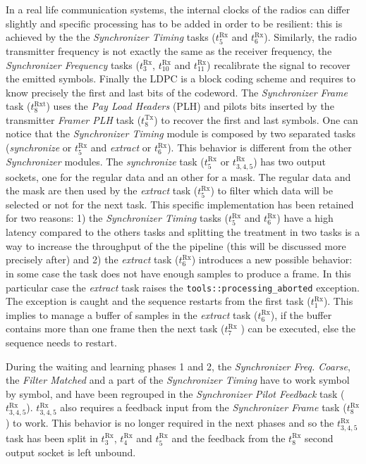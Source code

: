 In a real life communication systems, the internal clocks of the radios can
differ slightly and specific processing has to be added in order to be
resilient: this is achieved by the the \emph{Synchronizer Timing} tasks
($t^\text{Rx}_5$ and $t^\text{Rx}_6$). Similarly, the radio transmitter
frequency is not exactly the same as the receiver frequency, the
\emph{Synchronizer Frequency} tasks ($t^\text{Rx}_3$, $t^\text{Rx}_{10}$ and
$t^\text{Rx}_{11}$) recalibrate the signal to recover the emitted symbols.
Finally the LDPC is a block coding scheme and requires to know precisely the
first and last bits of the codeword. The \emph{Synchronizer Frame} task
($t^\text{Rxt}_8$) uses the \emph{Pay Load Headers} (PLH) and pilots bits
inserted by the transmitter \emph{Framer PLH} task ($t^\text{Tx}_8$) to recover
the first and last symbols. One can notice that the \emph{Synchronizer Timing}
module is composed by two separated tasks (\emph{synchronize} or $t^\text{Rx}_5$
and \emph{extract} or $t^\text{Rx}_6$). This behavior is different from the
other \emph{Synchronizer} modules. The \emph{synchronize} task ($t^\text{Rx}_5$
or $t^\text{Rx}_{3,4,5}$) has two output sockets, one for the regular data and
an other for a mask. The regular data and the mask are then used by the
\emph{extract} task ($t^\text{Rx}_5$) to filter which data will be selected or
not for the next task. This specific implementation has been retained for two
reasons: 1) the \emph{Synchronizer Timing} tasks ($t^\text{Rx}_5$ and
$t^\text{Rx}_6$) have a high latency compared to the others tasks and splitting
the treatment in two tasks is a way to increase the throughput of the the
pipeline (this will be discussed more precisely after) and 2) the \emph{extract}
task ($t^\text{Rx}_6$) introduces a new possible behavior: in some case the task
does not have enough samples to produce a frame. In this particular case the
\emph{extract} task raises the \verb|tools::processing_aborted| exception.
The exception is caught and the sequence restarts from the first task
($t^\text{Rx}_1$). This implies to manage a buffer of samples in the
\emph{extract} task ($t^\text{Rx}_6$), if the buffer contains more than one
frame then the next task ($t^\text{Rx}_7$ ) can be executed, else the sequence
needs to restart.

During the waiting and learning phases 1 and 2, the \emph{Synchronizer Freq.
Coarse}, the \emph{Filter Matched} and a part of the \emph{Synchronizer Timing}
have to work symbol by symbol, and have been regrouped in the \emph{Synchronizer
Pilot Feedback} task ($t^\text{Rx}_{3,4,5}$). $t^\text{Rx}_{3,4,5}$ also
requires a feedback input from the \emph{Synchronizer Frame} task
($t^\text{Rx}_8$) to work. This behavior is no longer required in the next
phases and so the $t^\text{Rx}_{3,4,5}$ task has been split in $t^\text{Rx}_3$,
$t^\text{Rx}_4$ and $t^\text{Rx}_5$ and the feedback from the $t^\text{Rx}_8$
second output socket is left unbound.

